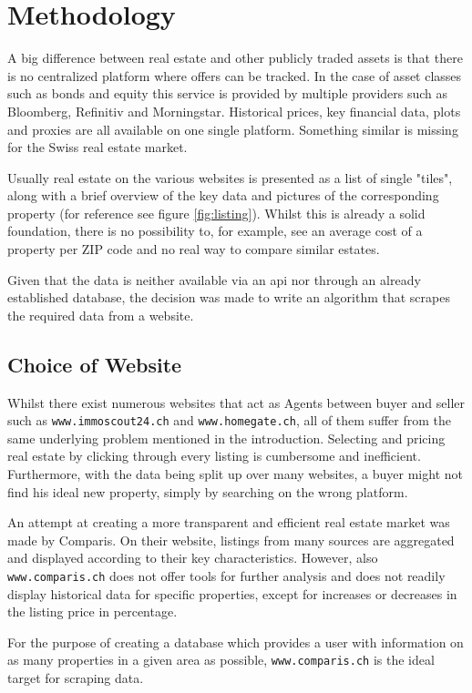 \documentclass[main]{subfiles}
\begin{document}
\section{Methodology}
A big difference between real estate and other publicly traded assets is that there is no centralized platform where offers can be tracked. 
In the case of asset classes such as bonds and equity this service is provided by multiple providers such as Bloomberg, Refinitiv and Morningstar.
Historical prices, key financial data, plots and proxies are all available on one single platform.
Something similar is missing for the Swiss real estate market. 

Usually real estate on the various websites is presented as a list of single "tiles",
along with a brief overview of the key data and pictures of the corresponding property (for reference see figure \ref{fig:listing}).
Whilst this is already a solid foundation, 
there is no possibility to, for example,
see an average cost of a property per ZIP code and no real way to compare similar estates.

Given that the data is neither available via an \acs*{api} nor through an already established database,
the decision was made to write an algorithm that scrapes the required data from a website.

\subsection{Choice of Website}

Whilst there exist numerous websites that act as Agents between buyer and seller such as \verb|www.immoscout24.ch| and \verb|www.homegate.ch|,
all of them suffer from the same underlying problem mentioned in the introduction. 
Selecting and pricing real estate by clicking through every listing is cumbersome and inefficient.
Furthermore, with the data being split up over many websites, 
a buyer might not find his ideal new property, simply by searching on the wrong platform.

An attempt at creating a more transparent and efficient real estate market was made by Comparis. 
On their website, listings from many sources are aggregated and displayed according to their key characteristics.
However, also \verb|www.comparis.ch| does not offer tools for further analysis and does not readily display historical data 
for specific properties, except for increases or decreases in the listing price in percentage.

For the purpose of creating a database which provides a user with information on as many properties in a given area as possible, 
\verb|www.comparis.ch| is the ideal target for scraping data.
\end{document}
